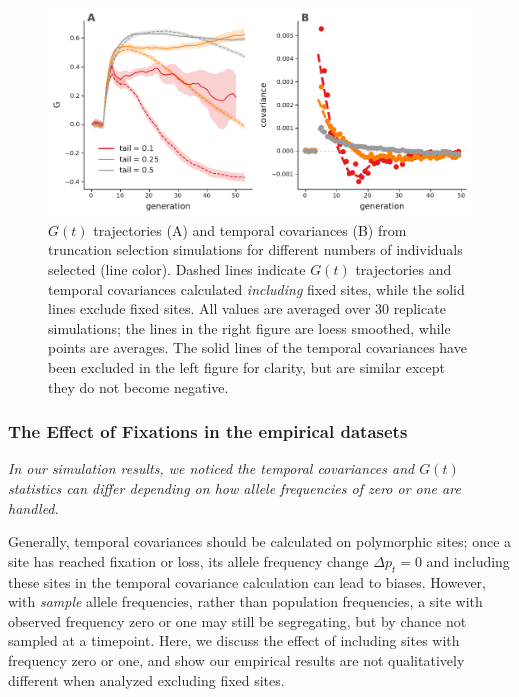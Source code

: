 \documentclass[11pt]{article}
\newcommand{\gc}[1]{{\it \color{red} #1 } }
\begin{document}
{\begin{figure}[!ht]
  \centering
  \includegraphics[width=\textwidth]{figures/fig-both-trunc.pdf}

  \caption{$G(t)$ trajectories (A) and temporal covariances (B) from
    truncation selection simulations for different numbers of individuals
    selected (line color). Dashed lines indicate $G(t)$ trajectories and
    temporal covariances calculated \emph{including} fixed sites, while the
    solid lines exclude fixed sites. All values are averaged over 30 replicate
    simulations; the lines in the right figure are loess smoothed, while points
    are averages. The solid lines of the temporal covariances have been
    excluded in the left figure for clarity, but are similar except they do not
    become negative.}

    \label{suppfig:supp-trunc}
\end{figure}




\subsubsection{The Effect of Fixations in the empirical datasets}
\label{supp:fixation}
\gc{In our simulation results, we noticed the temporal covariances and $G(t)$ statistics
can differ depending on how allele frequencies of zero or one are handled.

Generally, temporal covariances should be calculated on polymorphic sites; once
a site has reached fixation or loss, its allele frequency change $\Delta p_t =
0$ and including these sites in the temporal covariance calculation can lead to
biases. However, with \emph{sample} allele frequencies,
rather than population frequencies, a site with observed frequency zero or one
may still be segregating, but by chance not sampled at a timepoint. Here, we
discuss the effect of including sites with frequency zero or one, and show our
empirical results are not qualitatively different when analyzed excluding fixed
sites.

}}
\end{document}
